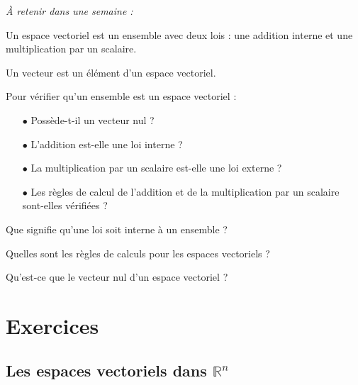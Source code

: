 
\begin{resumeBox}
  \emph{À retenir dans une semaine :} 
  \begin{niceitemize}
    \item Un espace vectoriel est un ensemble avec deux lois : une addition interne et une multiplication par un scalaire.
    \item Un vecteur est un élément d'un espace vectoriel.
    \item Pour vérifier qu'un ensemble est un espace vectoriel  :
      \begin{itemize}
        \item[$\bullet$] Possède-t-il un vecteur nul ?
        \item[$\bullet$] L'addition est-elle une loi interne ?
        \item[$\bullet$] La multiplication par un scalaire est-elle une loi externe ?
        \item[$\bullet$] Les règles de calcul de l'addition et de la multiplication par un scalaire sont-elles vérifiées ?
      \end{itemize}
  \end{niceitemize}
\end{resumeBox}

\begin{rappelsBox}
  \begin{niceitemize}
    \item Que signifie qu'une loi soit interne à un ensemble ?
    \item Quelles sont les règles de calculs pour les espaces vectoriels ?
    \item Qu'est-ce que le vecteur nul d'un espace vectoriel ?
  \end{niceitemize}
\end{rappelsBox}

\section{Exercices}
\subsection{Les espaces vectoriels dans $\mathbb{R}^n$}

